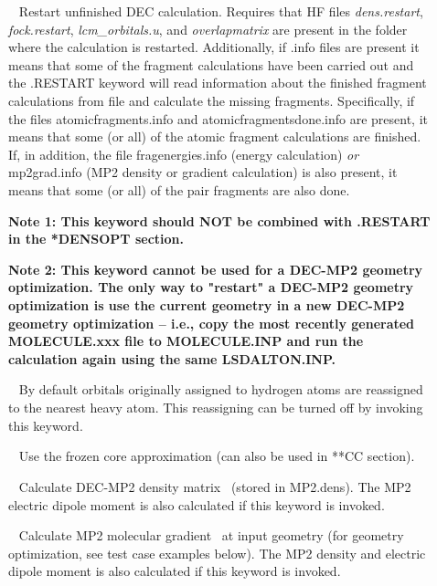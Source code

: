 \begin{description}
\item[] \verb| | \newline
Restart unfinished DEC calculation. Requires that HF files \emph{dens.restart}, \emph{fock.restart}, \emph{lcm\_orbitals.u}, and \emph{overlapmatrix} are present in the folder where the calculation is restarted. Additionally, if .info files are present it means that some of the fragment calculations have been
carried out and the .RESTART keyword will read information about the finished fragment calculations from file and calculate the missing fragments.
Specifically, if the files atomicfragments.info and atomicfragmentsdone.info are present, it means that some (or all) of the atomic fragment calculations are finished. If, in addition, the file fragenergies.info (energy calculation) \emph{or} mp2grad.info (MP2 density or gradient calculation) is also present,
it means that some (or all) of the pair fragments are also done.

\textbf{Note 1: This keyword should NOT be combined with .RESTART in the *DENSOPT section.}

\textbf{Note 2: This keyword cannot be used for a DEC-MP2 geometry optimization. The only way to "restart" a DEC-MP2 geometry optimization is use the current geometry in a new DEC-MP2 geometry optimization -- i.e., copy the most recently generated MOLECULE.xxx file to MOLECULE.INP and run the calculation again using the same LSDALTON.INP.}


\item[] \verb| | \newline
By default orbitals originally assigned to hydrogen atoms are reassigned to the nearest heavy atom. This reassigning can be turned off by invoking this keyword.

\item[]  \verb| | \newline
Use the frozen core approximation (can also be used in **CC section).


\item[] \verb| | \newline
Calculate DEC-MP2 density matrix~\cite{dec5} (stored in MP2.dens). The MP2 electric dipole moment is also calculated if this keyword is invoked.

\item[] \verb| | \newline
Calculate MP2 molecular gradient~\cite{dec5} at input geometry (for geometry optimization, see test case examples below). The MP2 density and electric dipole moment is also calculated if this keyword is invoked.


\end{description}
